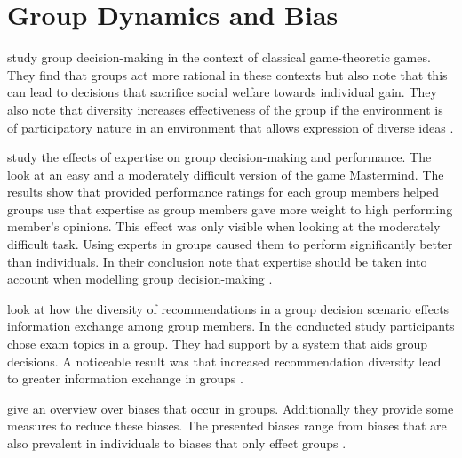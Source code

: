 \section{Group Dynamics and Bias}
\label{sec:Related_Work:GroupDynamicsAndBias}

\begin{description}[style=unboxed, leftmargin=0cm, font=\normalfont]
    \item[\citeauthor{charnessGroupsMakeBetter2012}] study group decision-making in the context of classical game-theoretic games. They find that groups act more rational in these contexts but also note that this can lead to decisions that sacrifice social welfare towards individual gain. They also note that diversity increases effectiveness of the group if the environment is of participatory nature in an environment that allows expression of diverse ideas \cite{charnessGroupsMakeBetter2012}.
    \item[\citeauthor{bonnerEffectsMemberExpertise2002}] study the effects of expertise on group decision-making and performance. The look at an easy and a moderately difficult version of the game Mastermind. The results show that provided performance ratings for each group members helped groups use that expertise as group members gave more weight to high performing member's opinions. This effect was only visible when looking at the moderately difficult task. Using experts in groups caused them to perform significantly better than individuals. In their conclusion \citeauthor{bonnerEffectsMemberExpertise2002} note that expertise should be taken into account when modelling group decision-making \cite{bonnerEffectsMemberExpertise2002}.
    \item[\citeauthor{atasItemRecommendationUsing2017}] look at how the diversity of recommendations in a group decision scenario effects information exchange among group members. In the conducted study participants chose exam topics in a group. They had support by a system that aids group decisions. A noticeable result was that increased recommendation diversity lead to greater information exchange in groups \cite{atasItemRecommendationUsing2017}. 
    \item[\citeauthor{felfernigBiasesGroupDecisions2018}] give an overview over biases that occur in groups. Additionally they provide some measures to reduce these biases. The presented biases range from biases that are also prevalent in individuals to biases that only effect groups \cite{felfernigBiasesGroupDecisions2018}.
\end{description}

